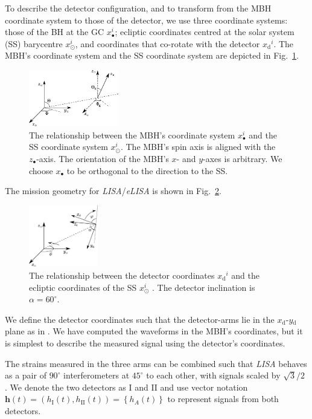 \documentclass[useAMS,usedcolumn,usegraphicx,usenatbib]{mn2e}
\newcommand{\figref}[1]{Fig.~\ref{fig:#1}}
\newcommand{\sub}[1]{\ensuremath{_\mathrm{#1}}}
\begin{document}
To describe the detector configuration, and to transform from the MBH coordinate system to those of the detector, we use three coordinate systems: those of the BH at the GC $x_\bullet^i$; ecliptic coordinates centred at the solar system (SS) barycentre $x_\odot^i$, and coordinates that co-rotate with the detector $x\sub{d}^i$. The MBH's coordinate system and the SS coordinate system are depicted in \figref{BH_SS}.
\begin{figure}
\begin{center}
 \includegraphics[width=0.35\textwidth]{BH_SS_angles}
    \caption{The relationship between the MBH's coordinate system $x_\bullet^i$ and the SS coordinate system $x_\odot^i$. The MBH's spin axis is aligned with the $z_\bullet$-axis. The orientation of the MBH's $x$- and $y$-axes is arbitrary. We choose $x_\bullet$ to be orthogonal to the direction to the SS.}
   \label{fig:BH_SS}
\end{center}
\end{figure}
The mission geometry for \textit{LISA}/\textit{eLISA} is shown in \figref{SS_LISA}.
\begin{figure}
\begin{center}
 \includegraphics[width=0.27\textwidth]{SS_LISA}
    \caption{The relationship between the detector coordinates $x\sub{d}^i$ and the ecliptic coordinates of the SS $x_\odot^i$ \citep{Bender1998, Jennrich2011}. The detector inclination is $\alpha = 60^{\circ}$.}
   \label{fig:SS_LISA}
\end{center}
\end{figure}
We define the detector coordinates such that the detector-arms lie in the $x\sub{d}$-$y\sub{d}$ plane as in \citet{Cutler1998}. We have computed the waveforms in the MBH's coordinates, but it is simplest to describe the measured signal using the detector's coordinates.

The strains measured in the three arms can be combined such that \textit{LISA} behaves as a pair of $90^{\circ}$ interferometers at $45^{\circ}$ to each other, with signals scaled by ${\sqrt{3}}/{2}$ \citep{Cutler1998}. We denote the two detectors as I and II and use vector notation $\boldsymbol{h}(t) = \left(h\sub{I}(t), h\sub{II}(t)\right) = \left\{h_A(t)\right\}$ to represent signals from both detectors.
\end{document}

